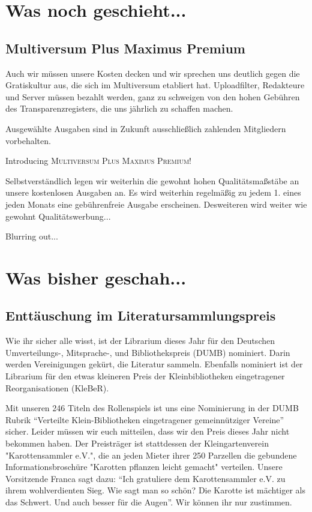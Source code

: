 \documentclass[final]{multiversum}
\begin{document}
\makemultititle
%


\section{Was noch geschieht...}

\subsection{Multiversum Plus Maximus Premium}
Auch wir müssen unsere Kosten decken und wir sprechen uns deutlich gegen die Gratiskultur aus, die sich im Multiversum etabliert hat. 
Uploadfilter, Redakteure und Server müssen bezahlt werden, ganz zu schweigen von den hohen Gebühren des Transparenzregisters, die uns jährlich zu schaffen machen.

Ausgewählte Ausgaben sind in Zukunft ausschließlich zahlenden Mitgliedern vorbehalten.
\begin{center}Introducing \textsc{Multiversum Plus Maximus Premium!}\end{center}

Selbstverständlich legen wir weiterhin die gewohnt hohen Qualitätsmaßstäbe an unsere kostenlosen Ausgaben an.
Es wird weiterhin regelmäßig zu jedem 1. eines jeden Monats eine gebührenfreie Ausgabe erscheinen.
Desweiteren wird weiter wie gewohnt Qualitätswerbung...

Blurring out...

\section{Was bisher geschah...}

\subsection{Enttäuschung im Literatursammlungspreis}
Wie ihr sicher alle wisst, ist der Librarium dieses Jahr für den Deutschen Umverteilungs-, Mitsprache-, und Bibliothekspreis (DUMB) nominiert.
Darin werden Vereinigungen gekürt, die Literatur sammeln.
Ebenfalls nominiert ist der Librarium für den etwas kleineren Preis der Kleinbibliotheken eingetragener Reorganisationen (KleBeR).

Mit unseren 246 Titeln des Rollenspiels ist uns eine Nominierung in der DUMB Rubrik \enquote{Verteilte Klein-Bibliotheken eingetragener gemeinnütziger Vereine} sicher.
Leider müssen wir euch mitteilen, dass wir den Preis dieses Jahr nicht bekommen haben.
Der Preisträger ist stattdessen der Kleingartenverein "Karottensammler e.V.", die an jeden Mieter ihrer 250 Parzellen die gebundene Informationsbroschüre "Karotten pflanzen leicht gemacht" verteilen.
Unsere Vorsitzende Franca sagt dazu: \enquote{Ich gratuliere dem Karottensammler e.V. zu ihrem wohlverdienten Sieg. 
Wie sagt man so schön? Die Karotte ist mächtiger als das Schwert. Und auch besser für die Augen}.
Wir können ihr nur zustimmen.
\end{document}
